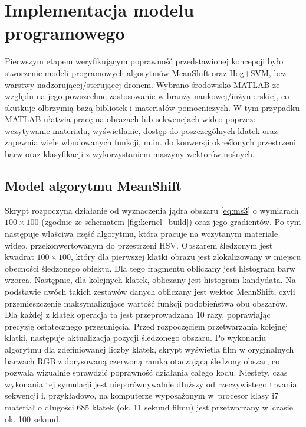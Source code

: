 \chapter{Implementacja modelu programowego}


Pierwszym etapem weryfikującym poprawność przedstawionej koncepcji było stworzenie modeli programowych algorytmów MeanShift oraz Hog+SVM, bez warstwy nadzorującej/sterującej dronem. 
Wybrano środowisko MATLAB ze względu na jego powszechne zastosowanie w branży naukowej/inżynierskiej, co skutkuje olbrzymią bazą bibliotek i materiałów pomocniczych. 
W tym przypadku MATLAB ułatwia pracę na obrazach lub sekwencjach wideo poprzez: wczytywanie materiału, wyświetlanie, dostęp do poszczególnych klatek oraz zapewnia wiele wbudowanych funkcji, m.in. do konwersji określonych przestrzeni barw oraz klasyfikacji z wykorzystaniem maszyny wektorów nośnych. 

\section{Model algorytmu  MeanShift}

Skrypt rozpoczyna działanie od wyznaczenia jądra obszaru \eqref{eq:ms3} o wymiarach $100 \times 100$ (zgodnie ze schematem \ref{fig:kernel_build}) oraz jego gradientów. %
Po tym następuje właściwa część algorytmu, która pracuje na wczytanym materiale wideo, przekonwertowanym do przestrzeni HSV. 
Obszarem śledzonym jest kwadrat $100 \times 100$, który dla pierwszej klatki obrazu jest zlokalizowany w miejscu obecności śledzonego obiektu. 
Dla tego fragmentu obliczany jest histogram barw wzorca. 
Następnie, dla kolejnych klatek, obliczany jest histogram kandydata. Na podstawie dwóch takich zestawów danych obliczany jest wektor MeanShift, czyli przemieszczenie maksymalizujące wartość funkcji podobieństwa obu obszarów. %
Dla każdej z klatek operacja ta jest przeprowadzana 10 razy, poprawiając precyzję ostatecznego przesunięcia. 
Przed rozpoczęciem przetwarzania kolejnej klatki, następuje aktualizacja pozycji śledzonego obszaru. 
Po wykonaniu algorytmu dla zdefiniowanej liczby klatek, skrypt wyświetla film w oryginalnych barwach RGB z dorysowaną czerwoną ramką otaczającą śledzony obszar, co pozwala wizualnie sprawdzić poprawność działania całego kodu. 
Niestety, czas wykonania tej symulacji jest nieporównywalnie dłuższy od rzeczywistego trwania sekwencji i, przykładowo, na komputerze wyposażonym w~procesor klasy i7 materiał o długości 685 klatek (ok. 11 sekund filmu) jest przetwarzany w~czasie ok. 100 sekund.

